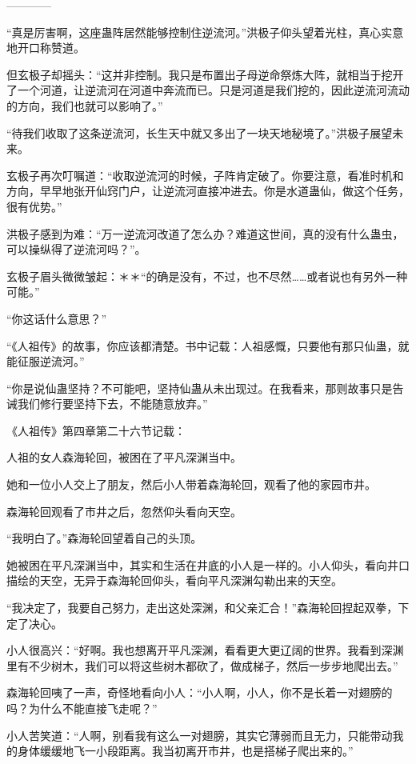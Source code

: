 
\begin{this_body}

------------

“真是厉害啊，这座蛊阵居然能够控制住逆流河。”洪极子仰头望着光柱，真心实意地开口称赞道。

但玄极子却摇头：“这并非控制。我只是布置出子母逆命祭炼大阵，就相当于挖开了一个河道，让逆流河在河道中奔流而已。只是河道是我们挖的，因此逆流河流动的方向，我们也就可以影响了。”

“待我们收取了这条逆流河，长生天中就又多出了一块天地秘境了。”洪极子展望未来。

玄极子再次叮嘱道：“收取逆流河的时候，子阵肯定破了。你要注意，看准时机和方向，早早地张开仙窍门户，让逆流河直接冲进去。你是水道蛊仙，做这个任务，很有优势。”

洪极子感到为难：“万一逆流河改道了怎么办？难道这世间，真的没有什么蛊虫，可以操纵得了逆流河吗？”。

玄极子眉头微微皱起：＊＊“的确是没有，不过，也不尽然……或者说也有另外一种可能。”

“你这话什么意思？”

“《人祖传》的故事，你应该都清楚。书中记载：人祖感慨，只要他有那只仙蛊，就能征服逆流河。”

“你是说仙蛊坚持？不可能吧，坚持仙蛊从未出现过。在我看来，那则故事只是告诫我们修行要坚持下去，不能随意放弃。”

《人祖传》第四章第二十六节记载：

人祖的女人森海轮回，被困在了平凡深渊当中。

她和一位小人交上了朋友，然后小人带着森海轮回，观看了他的家园市井。

森海轮回观看了市井之后，忽然仰头看向天空。

“我明白了。”森海轮回望着自己的头顶。

她被困在平凡深渊当中，其实和生活在井底的小人是一样的。小人仰头，看向井口描绘的天空，无异于森海轮回仰头，看向平凡深渊勾勒出来的天空。

“我决定了，我要自己努力，走出这处深渊，和父亲汇合！”森海轮回捏起双拳，下定了决心。

小人很高兴：“好啊。我也想离开平凡深渊，看看更大更辽阔的世界。我看到深渊里有不少树木，我们可以将这些树木都砍了，做成梯子，然后一步步地爬出去。”

森海轮回咦了一声，奇怪地看向小人：“小人啊，小人，你不是长着一对翅膀的吗？为什么不能直接飞走呢？”

小人苦笑道：“人啊，别看我有这么一对翅膀，其实它薄弱而且无力，只能带动我的身体缓缓地飞一小段距离。我当初离开市井，也是搭梯子爬出来的。”


\end{this_body}
